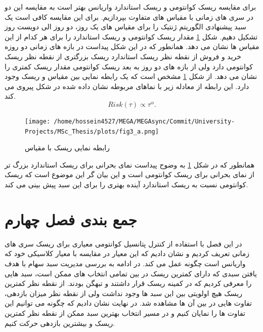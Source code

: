 \documentclass[a4paper,titlepage,12pt,fleqn,oneside]{report}
\begin{document}
برای مقایسه ریسک کوانتومی و ریسک استاندارد واریانس بهتر است به مقایسه این دو در سری های زمانی با مقیاس های متفاوت بپردازیم.
برای این مقایسه کافی است یک سبد پیشنهادی الگوریتم ژنتیک را برای مقیاس های یک روز، دو روز الی دویست روز تشکیل دهیم. شکل 
\ref{fig:5.9}
مقدار ریسک کوانتومی و ریسک استاندارد را برای هر کدام از این مقیاس ها نشان می دهد. همانطور که در این شکل پیداست در بازه های زمانی دو روزه خرید و فروش از نقطه نظر ریسک استاندارد ریسک بزرگتری از نقطه نظر ریسک کوانتومی دارد ولی از بازه های دو روز به بعد ریسک کوانتومی مقدار ریسک کمتری را نشان می دهد. از شکل 
\ref{fig:5.9}
مشخص است که یک رابطه نمایی بین مقیاس و ریسک وجود دارد. این رابطه از معادله زیر با نماهای مربوطه نشان داده شده در شکل پیروی می کند. 
\begin{equation}
Risk(\tau) \propto \tau^\alpha.
\label{eq:4}
\end{equation}
\begin{figure}[ptb]
	\centering
	\texttt{[image: /home/hossein4527/MEGA/MEGAsync/Commit/University-Projects/MSc\_Thesis/plots/fig3\_a.png]}
	\caption{رابطه نمایی ریسک با مقیاس}
	\label{fig:5.9}
\end{figure}
همانطور که در شکل
\ref{fig:5.9}
به وضوح پیداست نمای بحرانی برای ریسک استاندارد بزرگ تر از نمای بحرانی برای ریسک کوانتومی است و این بیان  گر این موضوع است که ریسک کوانتومی نسبت به ریسک استاندارد آینده بهتری را برای این سبد پیش بینی می کند.

\section{جمع بندی فصل چهارم}
در این فصل با استفاده از کنترل پتانسیل کوانتومی معیاری برای ریسک سری های زمانی تعریف کردیم و نشان دادیم که این معیار در مقایسه با معیار کلاسیکی خود که واریانس است چگونه عمل می کند. در ادامه به بررسی مدیریت سبد سهام با هدف یافتن سبدی که دارای کمترین ریسک در بین تمامی انتخاب های ممکن است، سبد هایی را معرفی کردیم که در کمینه ریسک قرار داشتند و تبهگن بودند. از نقطه نظر کمترین ریسک هیچ اولویتی بین این سبد ها وجود نداشت ولی از نقطه نظر میزان بازدهی، تفاوت هایی در بین آن ها مشاهده شد. در نهایت نشان دادیم که چگونه می توانیم این تفاوت ها را نمایان کنیم و در مسیر انتخاب بهترین سبد ممکن از نقطه نظر کمترین ریسک و بیشترین بازدهی حرکت کنیم.


\end{document}
